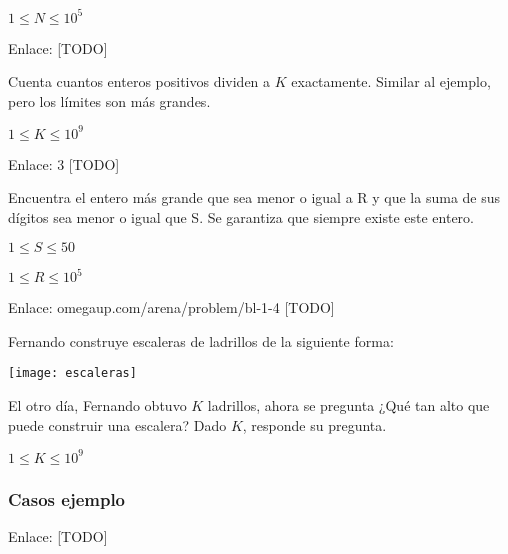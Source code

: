 \begin{plimits}
	\item \(1\leq N \leq 10^5\)
\end{plimits}

Enlace: [TODO]

\problembreak

\problemtitle Cuenta cuantos enteros positivos dividen a \(K\) exactamente. Similar al ejemplo, pero los límites son más grandes.
\begin{plimits}	
\item \(1\leq K \leq 10^9\)
\end{plimits}

Enlace: 3 [TODO]

\problembreak

\problemtitle Encuentra el entero más grande que sea menor o igual a R y que la suma de sus dígitos sea menor o igual que S. Se garantiza que siempre existe este entero.
\begin{plimits}
\item \(1\leq S\leq 50\)
\item \(1\leq R\leq10^5\)
\end{plimits}

Enlace: omegaup.com/arena/problem/bl-1-4 [TODO]

\problembreak

\problemtitle Fernando construye escaleras de ladrillos de la siguiente forma:
\begin{center}
\texttt{[image: escaleras]}
\end{center}

El otro día, Fernando obtuvo \(K\) ladrillos, ahora se pregunta ¿Qué tan alto que puede construir una escalera? Dado \(K\), responde su pregunta.

\begin{plimits}
	\item \(1\leq K \leq 10^9\)
\end{plimits}

\subsubsection{Casos ejemplo}
\begin{casebox2}
\end{casebox2}

Enlace: [TODO]
